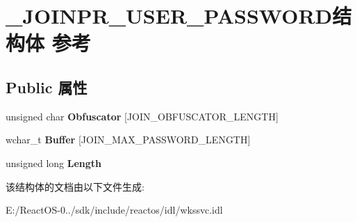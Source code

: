 \hypertarget{struct___j_o_i_n_p_r___u_s_e_r___p_a_s_s_w_o_r_d}{}\section{\+\_\+\+J\+O\+I\+N\+P\+R\+\_\+\+U\+S\+E\+R\+\_\+\+P\+A\+S\+S\+W\+O\+R\+D结构体 参考}
\label{struct___j_o_i_n_p_r___u_s_e_r___p_a_s_s_w_o_r_d}
\subsection*{Public 属性}
\begin{DoxyCompactItemize}
\item 
\mbox{\label{struct___j_o_i_n_p_r___u_s_e_r___p_a_s_s_w_o_r_d_a493508b908d38389cec3fbdb887e453a}} 
unsigned char {\bfseries Obfuscator} \mbox{[}J\+O\+I\+N\+\_\+\+O\+B\+F\+U\+S\+C\+A\+T\+O\+R\+\_\+\+L\+E\+N\+G\+TH\mbox{]}
\item 
\mbox{\label{struct___j_o_i_n_p_r___u_s_e_r___p_a_s_s_w_o_r_d_a67c5bf1b5edc922be03869662c0686bf}} 
wchar\+\_\+t {\bfseries Buffer} \mbox{[}J\+O\+I\+N\+\_\+\+M\+A\+X\+\_\+\+P\+A\+S\+S\+W\+O\+R\+D\+\_\+\+L\+E\+N\+G\+TH\mbox{]}
\item 
\mbox{\label{struct___j_o_i_n_p_r___u_s_e_r___p_a_s_s_w_o_r_d_ace78ace7f53192cc42a36c918a4ae131}} 
unsigned long {\bfseries Length}
\end{DoxyCompactItemize}


该结构体的文档由以下文件生成\+:\begin{DoxyCompactItemize}
\item 
E\+:/\+React\+O\+S-\/0../sdk/include/reactos/idl/wkssvc.\+idl\end{DoxyCompactItemize}
